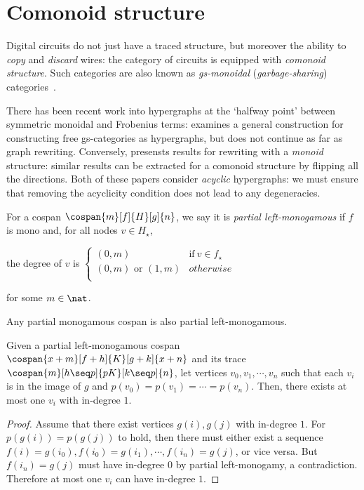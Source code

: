 \section{Comonoid structure}

Digital circuits do not just have a traced structure, but moreover the ability to \emph{copy} and \emph{discard} wires: the category of circuits is equipped with \emph{comonoid structure}.
Such categories are also known as \emph{gs-monoidal} (\emph{garbage-sharing}) categories~\cite{fritz2022free}.

There has been recent work into hypergraphs at the `halfway point' between symmetric monoidal and Frobenius terms: \cite{fritz2022free} examines a general construction for constructing free gs-categories as hypergraphs, but does not continue as far as graph rewriting.
Conversely, \cite{milosavljevic2022string} presensts results for rewriting with a \emph{monoid} structure: similar results can be extracted for a comonoid structure by flipping all the directions.
Both of these papers consider \emph{acyclic} hypergraphs: we must ensure that removing the acyclicity condition does not lead to any degeneracies.

\begin{definition}
    For a cospan \(\cospan{m}[f]{H}[g]{n}\), we say it is \emph{partial left-monogamous} if \(f\) is mono and, for all nodes \(v \in H_\star\),
    \begin{center}
        the degree of \(v\) is \(\begin{cases}
            (0,m) & \text{if}\ v \in f_\star \\
            (0,m) \text{ or } (1,m) & otherwise \\
        \end{cases}\)
    \end{center}
    for some \(m \in \nat\).
\end{definition}

\begin{lemma}
    Any partial monogamous cospan is also partial left-monogamous.
\end{lemma}

\begin{lemma}
    \label{lem:trace-in-degree}
    Given a partial left-monogamous cospan \(\cospan{x+m}[f+h]{K}[g+k]{x+n}\) and its trace \(\cospan{m}[h \seq p]{pK}[k \seq p]{n}\), let vertices \(v_0, v_1, \cdots, v_n\) such that each \(v_i\) is in the image of \(g\) and \(p(v_0) = p(v_1) = \cdots = p(v_n)\).
    Then, there exists at most one \(v_i\) with in-degree \(1\).
\end{lemma}
\begin{proof}
    Assume that there exist vertices \(g(i),g(j)\) with in-degree \(1\).
    For \(p(g(i)) = p(g(j))\) to hold, then there must either exist a sequence \(f(i) = g(i_0), f(i_0) = g(i_1), \cdots, f(i_n) = g(j)\), or vice versa.
    But \(f(i_n) = g(j)\) must have in-degree \(0\) by partial left-monogamy, a contradiction.
    Therefore at most one \(v_i\) can have in-degree \(1\).
\end{proof}

